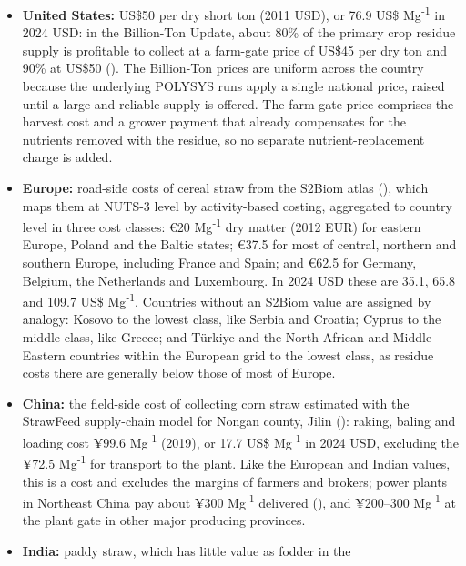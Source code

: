 \documentclass[
  letterpaper,
]{article}
\begin{document}
\begin{itemize}
\item
  \textbf{United States:} US\$50 per dry short ton (2011 USD), or 76.9
  US\$ Mg\textsuperscript{-1} in 2024 USD: in the Billion-Ton Update,
  about 80\% of the primary crop residue supply is profitable to collect
  at a farm-gate price of US\$45 per dry ton and 90\% at US\$50
  (). The Billion-Ton prices are
  uniform across the country because the underlying POLYSYS runs apply a
  single national price, raised until a large and reliable supply is
  offered. The farm-gate price comprises the harvest cost and a grower
  payment that already compensates for the nutrients removed with the
  residue, so no separate nutrient-replacement charge is added.
\item
  \textbf{Europe:} road-side costs of cereal straw from the S2Biom atlas
  (), which maps them at NUTS-3
  level by activity-based costing, aggregated to country level in three
  cost classes: €20 Mg\textsuperscript{-1} dry matter (2012 EUR) for
  eastern Europe, Poland and the Baltic states; €37.5 for most of
  central, northern and southern Europe, including France and Spain; and
  €62.5 for Germany, Belgium, the Netherlands and Luxembourg. In 2024
  USD these are 35.1, 65.8 and 109.7 US\$ Mg\textsuperscript{-1}.
  Countries without an S2Biom value are assigned by analogy: Kosovo to
  the lowest class, like Serbia and Croatia; Cyprus to the middle class,
  like Greece; and Türkiye and the North African and Middle Eastern
  countries within the European grid to the lowest class, as residue
  costs there are generally below those of most of Europe.
\item
  \textbf{China:} the field-side cost of collecting corn straw estimated
  with the StrawFeed supply-chain model for Nongan county, Jilin
  (): raking, baling and
  loading cost ¥99.6 Mg\textsuperscript{-1} (2019), or 17.7 US\$
  Mg\textsuperscript{-1} in 2024 USD, excluding the ¥72.5
  Mg\textsuperscript{-1} for transport to the plant. Like the European
  and Indian values, this is a cost and excludes the margins of farmers
  and brokers; power plants in Northeast China pay about ¥300
  Mg\textsuperscript{-1} delivered
  (), and ¥200--300
  Mg\textsuperscript{-1} at the plant gate in other major producing
  provinces.
\item
  \textbf{India:} paddy straw, which has little value as fodder in the

\end{itemize}
\end{document}
